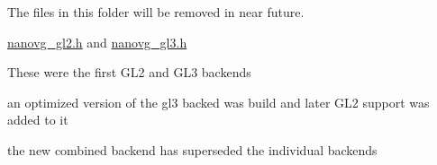The files in this folder will be removed in near future.


\begin{DoxyItemize}
\item \hyperlink{nanovg__gl2_8h_source}{nanovg\+\_\+gl2.\+h} and \hyperlink{nanovg__gl3_8h_source}{nanovg\+\_\+gl3.\+h}
\begin{DoxyItemize}
\item These were the first G\+L2 and G\+L3 backends
\item an optimized version of the gl3 backed was build and later G\+L2 support was added to it
\item the new combined backend has superseded the individual backends 
\end{DoxyItemize}
\end{DoxyItemize}
